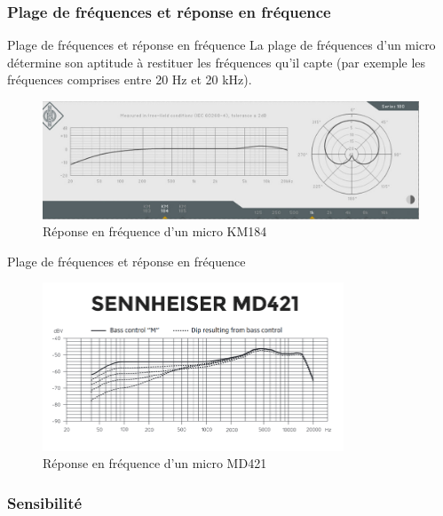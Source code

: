 \documentclass[aspectratio=169]{beamer}
\begin{document}
\subsubsection{Plage de fréquences et réponse en fréquence}
\begin{frame}{Plage de fréquences et réponse en fréquence}
La plage de fréquences d’un micro détermine son aptitude à restituer les fréquences qu’il capte (par exemple les fréquences comprises entre 20 Hz et 20 kHz).
	\begin{figure}[!h]
	\begin{center}
	\includegraphics[width=1\textwidth]{figure/Diagramm-KM184.jpg}
	\end{center}
	\caption{Réponse en fréquence d'un micro KM184}
	\end{figure}
\end{frame}

\begin{frame}{Plage de fréquences et réponse en fréquence}
	\begin{figure}[!h]
	\begin{center}
	\includegraphics[width=0.8\textwidth]{figure/sennheiser-MD421.png}
	\end{center}
	\caption{Réponse en fréquence d'un micro MD421}
	\end{figure}
\end{frame}
\subsubsection{Sensibilité}
\end{document}
